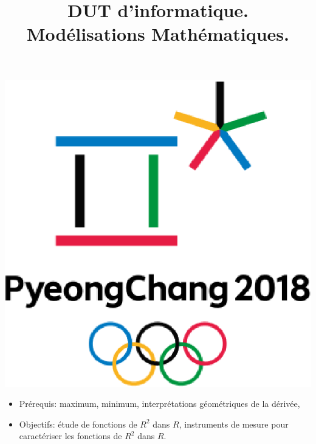 \documentclass[11pt,a4paper,french]{article}
\title{
DUT d'informatique.\\  
Modélisations Mathématiques.}
\date{}
\begin{document}
\vspace{-2em}
\maketitle
\vspace{-6em}
\begin{center}
\includegraphics[scale=0.5]{PyeongChang2018}
\end{center}

\vspace{-1em}
\begin{itemize}
\item Prérequis: maximum, minimum, interprétations géométriques de la dérivée, 
\item Objectifs:  étude de fonctions de $R^2$ dans $R$, instruments de mesure pour caractériser les fonctions de  $R^2$ dans $R$.
\end{itemize}
\end{document}
